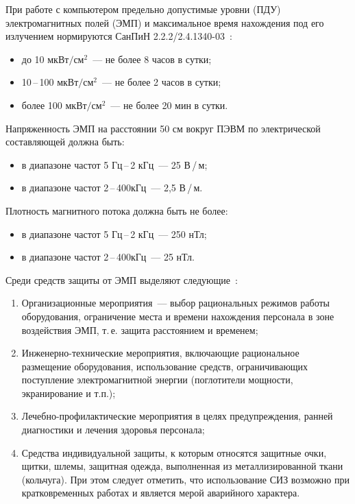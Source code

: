 При работе с компьютером предельно допустимые уровни (ПДУ) электромагнитных полей (ЭМП) и максимальное время нахождения под его излучением нормируются СанПиН 2.2.2/2.4.1340-03~\cite{SanPin2003}:
\begin{itemize}
    \item до 10 $\text{мкВт}/\text{см}^2$~--- не более 8 часов в сутки;
    \item 10\,--\,100 $\text{мкВт}/\text{см}^2$~--- не более 2 часов в сутки;
    \item более 100 $\text{мкВт}/\text{см}^2$~--- не более 20 мин в сутки.
\end{itemize}

Напряженность ЭМП на расстоянии 50 см вокруг ПЭВМ по электрической составляющей должна быть:
\begin{itemize}
    \item в диапазоне частот 5 Гц\,--\,2 кГц~--- 25 В\,/\,м;
    \item в диапазоне частот 2\,--\,400кГц~--- 2,5 В\,/\,м.
\end{itemize}

Плотность магнитного потока должна быть не более:
\begin{itemize}
    \item в диапазоне частот 5 Гц\,--\,2 кГц~--- 250 нТл;
    \item в диапазоне частот 2\,--\,400кГц~--- 25 нТл.
\end{itemize}

Среди средств защиты от ЭМП выделяют следующие~\cite{Bzd2007}:
\begin{enumerate}
[leftmargin=0pt,itemindent=\parindent+\labelwidth+\labelsep]
    \item Организационные мероприятия~--- выбор рациональных режимов работы оборудования, ограничение места и времени нахождения персонала в зоне воздействия ЭМП, т.\,е. защита расстоянием и временем;
    \item Инженерно-технические мероприятия, включающие рациональное размещение оборудования, использование средств, ограничивающих поступление электромагнитной энергии (поглотители мощности, экранирование и т.п.);
    \item Лечебно-профилактические мероприятия в целях предупреждения, ранней диагностики и лечения здоровья персонала;
    \item Средства индивидуальной защиты, к которым относятся защитные очки, щитки, шлемы, защитная одежда, выполненная из металлизированной ткани (кольчуга). При этом следует отметить, что использование СИЗ возможно при кратковременных работах и является мерой аварийного характера.
\end{enumerate}


